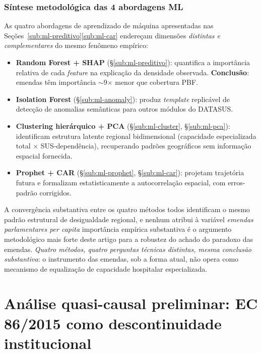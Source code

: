 \documentclass[12pt,a4paper,oneside]{article}
\begin{document}
\subsubsection{Síntese metodológica das 4 abordagens ML}

As quatro abordagens de aprendizado de máquina apresentadas nas
Seções~\ref{sub:ml-preditivo}\textendash\ref{sub:ml-car}
endereçam dimensões \textit{distintas e complementares} do mesmo
fenômeno empírico:

\begin{itemize}
\item \textbf{Random Forest + SHAP} (§\ref{sub:ml-preditivo}):
quantifica a importância relativa de cada \textit{feature} na
explicação da densidade observada. \textbf{Conclusão}: emendas
têm importância $\sim$9$\times$ menor que cobertura PBF.
\item \textbf{Isolation Forest} (§\ref{sub:ml-anomaly}): produz
\textit{template} replicável de detecção de anomalias semânticas
para outros módulos do DATASUS.
\item \textbf{Clustering hierárquico + PCA}
(§\ref{sub:ml-cluster}, §\ref{sub:ml-pca}): identificam estrutura
latente regional bidimensional (capacidade especializada total
$\times$ SUS-dependência), recuperando padrões geográficos sem
informação espacial fornecida.
\item \textbf{Prophet + CAR} (§\ref{sub:ml-prophet},
§\ref{sub:ml-car}): projetam trajetória futura e formalizam
estatisticamente a autocorrelação espacial, com erros-padrão
corrigidos.
\end{itemize}

A convergência substantiva entre os quatro métodos
\textemdash{} todos identificam o mesmo padrão estrutural de
desigualdade regional, e nenhum atribui à variável \textit{emendas
parlamentares per capita} importância empírica substantiva
\textemdash{} é o argumento metodológico mais forte deste artigo
para a robustez do achado do paradoxo das emendas. \textit{Quatro
métodos, quatro perguntas técnicas distintas, mesma conclusão
substantiva}: o instrumento das emendas, sob a forma atual, não
opera como mecanismo de equalização de capacidade hospitalar
especializada.

\section{Análise quasi-causal preliminar: EC 86/2015 como
descontinuidade institucional}\label{sec:causal}
\end{document}
